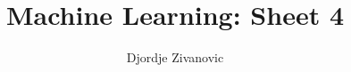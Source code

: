 \documentclass[10pt,a4paper]{article}
\author{Djordje Zivanovic}
\title{\textbf{Machine Learning: Sheet 4}}
\begin{document}
\maketitle
\bigskip
\newcommand{\transpose}[1]{#1 ^ \text{T}}
\newcommand{\mat}[1]{\textbf{\text{{#1}}}}
\newcommand{\vect}[1]{\mat{#1}}
\newcommand{\gradient}[1]{\nabla_{\vect{#1}}}
\newcommand{\der}[1]{\frac{\partial}{\partial #1}}
\newcommand{\numberthis}{\addtocounter{equation}{1}\tag{\theequation}}
\newcommand{\logfun}{\sigma(\transpose{\vect{x}}_i \vect{w})}
\newcommand{\softmaxi}{\frac{e^{z_i}}{\sum_{l=1}^Ce^{z_l}}}
\newcommand{\layersep}{2.5cm}
\newcommand{\layersepH}{6cm}
\newcommand{\layersepP}{7cm}
\newcommand{\layersepB}{9cm}
\newtheorem{theorem}{Theorem}
\newtheorem{lemma}[theorem]{Lemma}
\end{document}
